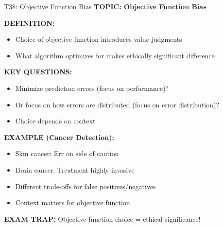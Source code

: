 \documentclass[8pt]{beamer}
\begin{document}
	\begin{frame}{T38: Objective Function Bias}
		\fontsize{6.5}{7.5}\selectfont
		\textbf{TOPIC: Objective Function Bias}
		
		\vspace{0.1cm}
		\textbf{DEFINITION:}
		\begin{itemize}
			\item Choice of objective function introduces value judgments
			\item What algorithm optimizes for makes ethically significant difference
		\end{itemize}
		
		\vspace{0.1cm}
		\textbf{KEY QUESTIONS:}
		\begin{itemize}
			\item Minimize prediction errors (focus on performance)?
			\item Or focus on how errors are distributed (focus on error distribution)?
			\item Choice depends on context
		\end{itemize}
		
		\vspace{0.1cm}
		\textbf{EXAMPLE (Cancer Detection):}
		\begin{itemize}
			\item \textcolor{myblue}{Skin cancer:} Err on side of caution
			\item \textcolor{myblue}{Brain cancer:} Treatment highly invasive
			\item Different trade-offs for false positives/negatives
			\item Context matters for objective function
		\end{itemize}
		
		\textcolor{myred}{\textbf{EXAM TRAP:}} Objective function choice = \textcolor{myblue}{ethical significance}!
	\end{frame}
	
\end{document}
